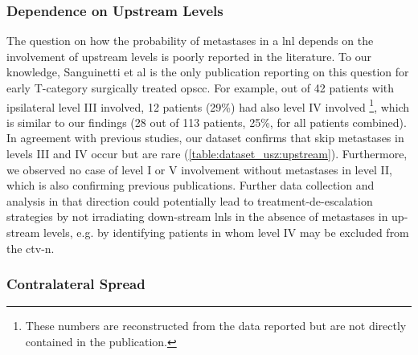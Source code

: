 \documentclass[\relativeRoot/main.tex]{subfiles}
\begin{document}
\subsubsection*{Dependence on Upstream Levels}

The question on how the probability of metastases in a \gls{lnl} depends on the involvement of upstream levels is poorly reported in the literature. To our knowledge, Sanguinetti et al \cite{sanguineti_defining_2009} is the only publication reporting on this question for early T-category surgically treated \gls{opscc}. For example, out of 42 patients with ipsilateral level III involved, 12 patients (29\%) had also level IV involved \footnote{These numbers are reconstructed from the data reported but are not directly contained in the publication.
}, which is similar to our findings (28 out of 113 patients, 25\%, for all patients combined). In agreement with previous studies, our dataset confirms that skip metastases in levels III and IV occur but are rare (\cref{table:dataset_usz:upstream}). Furthermore, we observed no case of level I or V involvement without metastases in level II, which is also confirming previous publications. Further data collection and analysis in that direction could potentially lead to treatment-de-escalation strategies by not irradiating down-stream \glspl{lnl} in the absence of metastases in up-stream levels, e.g. by identifying patients in whom level IV may be excluded from the \gls{ctv-n}.

\subsubsection*{Contralateral Spread}
\end{document}
